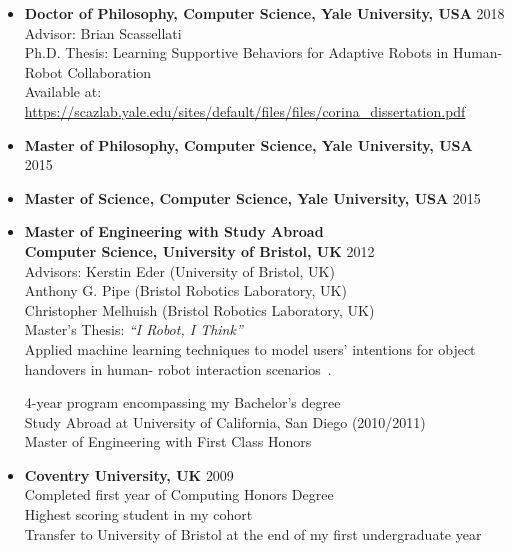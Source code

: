\documentclass[10pt,letterpaper]{article}
\newcommand{\thing}[2]{{#1} \hfill {#2}}
\begin{document}
\begin{itemize}%
\item \thing{\bf Doctor of Philosophy, Computer Science, Yale University, USA}{2018}\\
	Advisor: Brian Scassellati\\
	Ph.D. Thesis: Learning Supportive Behaviors for Adaptive Robots in Human-Robot Collaboration \\
	Available at: \href{https://scazlab.yale.edu/sites/default/files/files/corina_dissertation.pdf}{\url{https://scazlab.yale.edu/sites/default/files/files/corina_dissertation.pdf}}
		
\item \thing{\bf Master of Philosophy, Computer Science, Yale University, USA}{2015}
\item \thing{\bf Master of Science, Computer Science, Yale University, USA}{2015}
\item \thing{\bf Master of Engineering with Study Abroad\\Computer Science, University of Bristol, UK}{2012}\\
	Advisors: Kerstin Eder (University of Bristol, UK)\\
	\hphantom{Advisors:} Anthony G. Pipe (Bristol Robotics Laboratory, UK)\\
	\hphantom{Advisors:} Christopher Melhuish (Bristol Robotics Laboratory, UK)\\
	Master's Thesis: {\it ``I Robot, I Think''}\\
	Applied machine learning techniques to model users' intentions for object handovers in human-
robot interaction scenarios~\cite{grigore2013joint}.

	4-year program encompassing my Bachelor's degree\\
	Study Abroad at University of California, San Diego (2010/2011)\\
	Master of Engineering with First Class Honors
\item \thing{\bf Coventry University, UK}{2009}\\
	Completed first year of Computing Honors Degree\\
	Highest scoring student in my cohort\\
	Transfer to University of Bristol at the end of my first undergraduate year
\end{itemize}
\end{document}
